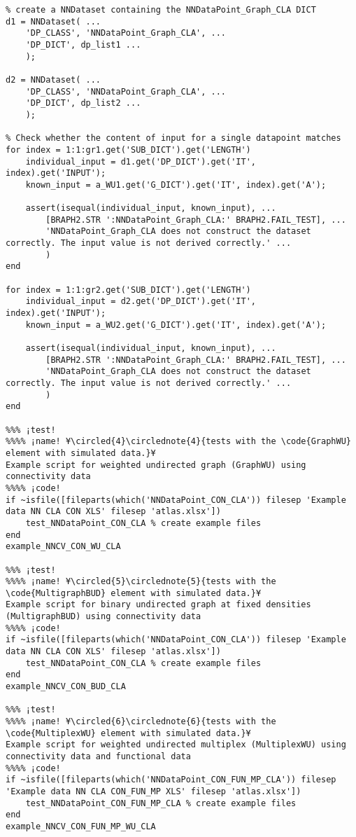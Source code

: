 \documentclass{tufte-handout}
\begin{document}
\begin{lstlisting}
% create a NNDataset containing the NNDataPoint_Graph_CLA DICT
d1 = NNDataset( ...
    'DP_CLASS', 'NNDataPoint_Graph_CLA', ...
    'DP_DICT', dp_list1 ...
    );

d2 = NNDataset( ...
    'DP_CLASS', 'NNDataPoint_Graph_CLA', ...
    'DP_DICT', dp_list2 ...
    );

% Check whether the content of input for a single datapoint matches
for index = 1:1:gr1.get('SUB_DICT').get('LENGTH')
    individual_input = d1.get('DP_DICT').get('IT', index).get('INPUT');
    known_input = a_WU1.get('G_DICT').get('IT', index).get('A');

    assert(isequal(individual_input, known_input), ...
        [BRAPH2.STR ':NNDataPoint_Graph_CLA:' BRAPH2.FAIL_TEST], ...
        'NNDataPoint_Graph_CLA does not construct the dataset correctly. The input value is not derived correctly.' ...
        )
end

for index = 1:1:gr2.get('SUB_DICT').get('LENGTH')
    individual_input = d2.get('DP_DICT').get('IT', index).get('INPUT');
    known_input = a_WU2.get('G_DICT').get('IT', index).get('A');

    assert(isequal(individual_input, known_input), ...
        [BRAPH2.STR ':NNDataPoint_Graph_CLA:' BRAPH2.FAIL_TEST], ...
        'NNDataPoint_Graph_CLA does not construct the dataset correctly. The input value is not derived correctly.' ...
        )
end

%%% ¡test!
%%%% ¡name! ¥\circled{4}\circlednote{4}{tests with the \code{GraphWU} element with simulated data.}¥
Example script for weighted undirected graph (GraphWU) using connectivity data
%%%% ¡code!
if ~isfile([fileparts(which('NNDataPoint_CON_CLA')) filesep 'Example data NN CLA CON XLS' filesep 'atlas.xlsx'])
    test_NNDataPoint_CON_CLA % create example files
end
example_NNCV_CON_WU_CLA

%%% ¡test!
%%%% ¡name! ¥\circled{5}\circlednote{5}{tests with the \code{MultigraphBUD} element with simulated data.}¥
Example script for binary undirected graph at fixed densities (MultigraphBUD) using connectivity data
%%%% ¡code!
if ~isfile([fileparts(which('NNDataPoint_CON_CLA')) filesep 'Example data NN CLA CON XLS' filesep 'atlas.xlsx'])
    test_NNDataPoint_CON_CLA % create example files
end
example_NNCV_CON_BUD_CLA

%%% ¡test!
%%%% ¡name! ¥\circled{6}\circlednote{6}{tests with the \code{MultiplexWU} element with simulated data.}¥
Example script for weighted undirected multiplex (MultiplexWU) using connectivity data and functional data
%%%% ¡code!
if ~isfile([fileparts(which('NNDataPoint_CON_FUN_MP_CLA')) filesep 'Example data NN CLA CON_FUN_MP XLS' filesep 'atlas.xlsx'])
    test_NNDataPoint_CON_FUN_MP_CLA % create example files
end
example_NNCV_CON_FUN_MP_WU_CLA

\end{lstlisting}
\end{document}
